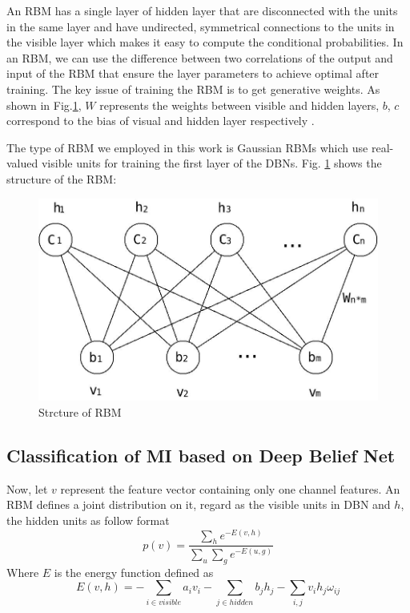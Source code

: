 \documentclass{llncs}
\begin{document}
An RBM has a single layer of hidden layer that are disconnected with the units in the same layer and have undirected, symmetrical connections to the units in the visible layer which makes it easy to compute the conditional probabilities. In an RBM, we can use the difference between two correlations of the output and input of the RBM that ensure the layer parameters to achieve optimal after training. The key issue of training the RBM is to get generative weights. As shown in Fig.\ref{fig:1}, $W$ represents the weights between visible and hidden layers, $b$, $c$ correspond to the bias of visual and hidden layer respectively \cite{3}.


The type of RBM we employed in this work is Gaussian RBMs which use real-valued visible units for training the first layer of the DBNs. Fig. \ref{fig:1} shows the structure of the RBM:
\begin{figure}[!htbp]
	\centering
		\includegraphics[scale=0.23]{figs/kdp1.jpeg}
		\caption{Strcture of RBM}  
    	\label{fig:1}
\end{figure}


\subsection{Classification of MI based on Deep Belief Net}
Now, let $v$ represent the feature vector containing only one channel features. An RBM defines a joint distribution on it, regard as the visible units in DBN and $h$, the hidden units as follow format\cite{13}
\begin{equation}
 p(v)=\frac{\sum_he^{-E(v,h)}}{\sum_u\sum_ge^{-E(u,g)}}
\end{equation}
Where $E$ is the energy function defined as
\begin{equation}
  E(v,h)=-\sum_{i \in visible}a_iv_i-
  \sum_{j \in hidden}b_jh_j-\sum_{i,j}v_ih_j\omega_{ij}
\end{equation}
\end{document}
